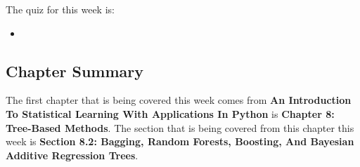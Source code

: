 The quiz for this week is:

\begin{itemize}
    \item {}
\end{itemize}

\newpage

\subsection{Chapter Summary}

The first chapter that is being covered this week comes from \textbf{An Introduction To Statistical Learning With Applications In Python} is \textbf{Chapter 8: Tree-Based Methods}. The section
that is being covered from this chapter this week is \textbf{Section 8.2: Bagging, Random Forests, Boosting, And Bayesian Additive Regression Trees}.

